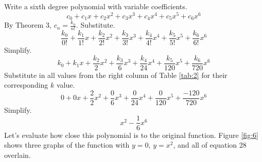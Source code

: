 \documentclass{article}
\begin{document}
Write a sixth degree polynomial with variable coefficients.
\begin{equation*}
    c_0+c_1x+c_2x^2+c_3x^3+c_4x^4+c_5x^5+c_6x^6
\end{equation*}
By Theorem 3, $c_n=\frac{k_n}{n!}$. Substitute.
\begin{equation*}
    \frac{k_0}{0!}+\frac{k_1}{1!}x+\frac{k_2}{2!}x^2+\frac{k_3}{3!}x^3+\frac{k_4}{4!}x^4+\frac{k_5}{5!}x^5+\frac{k_6}{6!}x^6
\end{equation*}
Simplify.
\begin{equation*}
    k_0+k_1x+\frac{k_2}{2}x^2+\frac{k_3}{6}x^3+\frac{k_4}{24}x^4+\frac{k_5}{120}x^5+\frac{k_6}{720}x^6
\end{equation*}
Substitute in all values from the right column of Table \ref{tab:2} for their corresponding $k$ value.
\begin{equation*}
    0+0x+\frac{2}{2}x^2+\frac{0}{6}x^3+\frac{0}{24}x^4+\frac{0}{120}x^5+\frac{-120}{720}x^6
\end{equation*}
Simplify.
\begin{equation}
    x^2-\frac{1}{6}x^6
\end{equation}
Let's evaluate how close this polynomial is to the original function. Figure \ref{fig:6} shows three graphs of the function with $y=0$, $y=x^2$, and all of equation 28 overlain.
\end{document}

